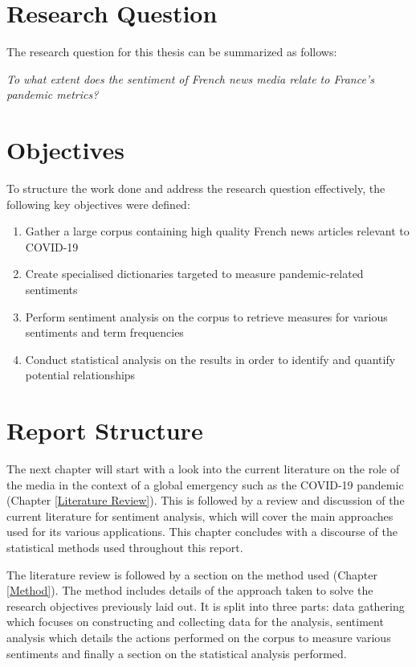 \section{Research Question}\label{chap: Research Question}

The research question for this thesis can be summarized as follows:

\begin{center}
    \emph{To what extent does the sentiment of French news media relate to France's pandemic metrics?}
\end{center}

\section{Objectives}\label{chap: Research Objectives}
To structure the work done and address the research question effectively, the following key objectives were defined:
\begin{enumerate}
    \item Gather a large corpus containing high quality French news articles relevant to COVID-19
    \item Create specialised dictionaries targeted to measure pandemic-related sentiments
    \item Perform sentiment analysis on the corpus to retrieve measures for various sentiments and term frequencies
    \item Conduct statistical analysis on the results in order to identify and quantify potential relationships
\end{enumerate}

\section{Report Structure}\label{Report Structure}

The next chapter will start with a look into the current literature on the role of the media in the context of a global emergency such as the COVID-19 pandemic (Chapter \ref{Literature Review}). This is followed by a review and discussion of the current literature for sentiment analysis, which will cover the main approaches used for its various applications. This chapter concludes with a discourse of the statistical methods used throughout this report.

The literature review is followed by a section on the method used (Chapter \ref{Method}). The method includes details of the approach taken to solve the research objectives previously laid out. It is split into three parts: data gathering which focuses on constructing and collecting data for the analysis, sentiment analysis which details the actions performed on the corpus to measure various sentiments and finally a section on the statistical analysis performed.

